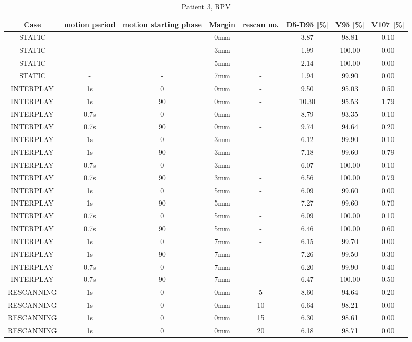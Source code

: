 \begin{table}[H]
  \centering
  \tiny
  \caption{Patient 3, RPV}
  \begin{tabular}{|c||c|c|c|c||c|c|c|}
    \hline\hline
    Case & motion period & motion starting phase & Margin & rescan no. & D5-D95 [\%] & V95 [\%] & V107 [\%] \\
    \hline 
STATIC & - & - & 0mm & - & 3.87 & 98.81 & 0.10 \\
STATIC & - & - & 3mm & - & 1.99 & 100.00 & 0.00 \\
STATIC & - & - & 5mm & - & 2.14 & 100.00 & 0.00 \\
STATIC & - & - & 7mm & - & 1.94 & 99.90 & 0.00 \\
INTERPLAY & 1s & 0 & 0mm & - & 9.50 & 95.03 & 0.50 \\
INTERPLAY & 1s & 90 & 0mm & - & 10.30 & 95.53 & 1.79 \\
INTERPLAY & 0.7s & 0 & 0mm & - & 8.79 & 93.35 & 0.10 \\
INTERPLAY & 0.7s & 90 & 0mm & - & 9.74 & 94.64 & 0.20 \\
INTERPLAY & 1s & 0 & 3mm & - & 6.12 & 99.90 & 0.10 \\
INTERPLAY & 1s & 90 & 3mm & - & 7.18 & 99.60 & 0.79 \\
INTERPLAY & 0.7s & 0 & 3mm & - & 6.07 & 100.00 & 0.10 \\
INTERPLAY & 0.7s & 90 & 3mm & - & 6.56 & 100.00 & 0.79 \\
INTERPLAY & 1s & 0 & 5mm & - & 6.09 & 99.60 & 0.00 \\
INTERPLAY & 1s & 90 & 5mm & - & 7.27 & 99.60 & 0.70 \\
INTERPLAY & 0.7s & 0 & 5mm & - & 6.09 & 100.00 & 0.10 \\
INTERPLAY & 0.7s & 90 & 5mm & - & 6.46 & 100.00 & 0.60 \\
INTERPLAY & 1s & 0 & 7mm & - & 6.15 & 99.70 & 0.00 \\
INTERPLAY & 1s & 90 & 7mm & - & 7.26 & 99.50 & 0.30 \\
INTERPLAY & 0.7s & 0 & 7mm & - & 6.20 & 99.90 & 0.40 \\
INTERPLAY & 0.7s & 90 & 7mm & - & 6.47 & 100.00 & 0.50 \\
RESCANNING & 1s & 0 & 0mm & 5 & 8.60 & 94.64 & 0.20 \\
RESCANNING & 1s & 0 & 0mm & 10 & 6.64 & 98.21 & 0.00 \\
RESCANNING & 1s & 0 & 0mm & 15 & 6.30 & 98.61 & 0.00 \\
RESCANNING & 1s & 0 & 0mm & 20 & 6.18 & 98.71 & 0.00 \\

\end{tabular}
\end{table}

